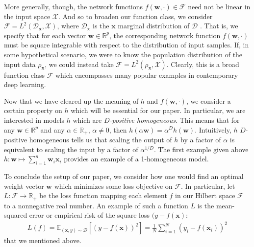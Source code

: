 \documentclass{article}
\begin{document}
More generally, though, the network functions $f(\boldsymbol{w}, \cdot) \in \mathcal{F}$ need not be linear in the input space $\mathcal{X}$. And so to broaden our function class, we consider $\mathcal{F} = L^2(\mathcal{D}_{\boldsymbol{x}}, \mathcal{X})$, where $\mathcal{D}_{\boldsymbol{x}}$ is the $\boldsymbol{x}$ marginal distribution of $\mathcal{D}$ \cite{chizat2018lazy}. That is, we specify that for each vector $\boldsymbol{w} \in \mathbb{R}^p$, the corresponding network function $f(\boldsymbol{w}, \cdot)$ must be square integrable with respect to the distribution of input samples. If, in some hypothetical scenario, we were to know the population distribution of the input data $\mathcal{\rho_{\boldsymbol{x}}}$, we could instead take $\mathcal{F} = L^2(\rho_{\boldsymbol{x}}, \mathcal{X})$. Clearly, this is a broad function class $\mathcal{F}$ which encompasses many popular examples in contemporary deep learning.

Now that we have cleared up the meaning of $h$ and $f(\boldsymbol{w}, \cdot)$, we consider a certain property on $h$ which will be essential for our paper. In particular, we are interested in models $h$ which are \textit{$D$-positive homogeneous}. This means that for any $\boldsymbol{w} \in \mathbb{R}^p$ and any $\alpha \in \mathbb{R}_+$, $\alpha \neq 0$, then $h(\alpha \boldsymbol{w}) = \alpha^D h(\boldsymbol{w})$. Intuitively, $h$ $D$-positive homogeneous tells us that scaling the output of $h$ by a factor of $\alpha$ is equivalent to scaling the input by a factor of $\alpha^{1/D}$. The first example given above $h: \boldsymbol{w} \mapsto \sum_{i=1}^n \boldsymbol{w}_i \boldsymbol{x}_i$ provides an example of a 1-homogeneous model.

To conclude the setup of our paper, we consider how one would find an optimal weight vector $\boldsymbol{w}$ which minimizes some loss objective on $\mathcal{F}$. In particular, let $L: \mathcal{F} \rightarrow \mathbb{R}_+$ be the loss function mapping each element $f$ in our Hilbert space $\mathcal{F}$ to a nonnegative real number. An example of such a function $L$ is the mean-squared error or empirical risk of the square loss $(y - f(\boldsymbol{x})$:
\begin{align}
   L(f) = \mathbb{E}_{(\boldsymbol{x}, y) \sim \mathcal{D}} \left[ \left(y - f(\boldsymbol{x}) \right)^2 \right] = \frac{1}{N}\sum_{i=1}^N (y_i - f(\boldsymbol{x}_i))^2\label{mse}
\end{align}
that we mentioned above. 
\end{document}
